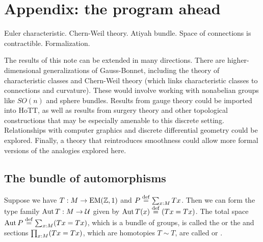 \section{Appendix: the program ahead}

Euler characteristic. Chern-Weil theory. Atiyah bundle. Space of connections is contractible. Formalization.

The results of this note can be extended in many directions. There are higher-dimensional generalizations of Gauss-Bonnet, including the theory of characteristic classes and Chern-Weil theory (which links characteristic classes to connections and curvature). These would involve working with nonabelian groups like \( SO(n) \) and sphere bundles. Results from gauge theory could be imported into HoTT, as well as results from surgery theory and other topological constructions that may be especially amenable to this discrete setting. Relationships with computer graphics and discrete differential geometry\cite{crane_ddg}\cite{crane_connections} could be explored. Finally, a theory that reintroduces smoothness could allow more formal versions of the analogies explored here. 

\subsection{The bundle of automorphisms}
\label{sec:automorphisms}
\begin{mydef}
Suppose we have \( T:M\to\mathrm{EM}(\mathbb{Z},1) \) and \( P\stackrel{\mathrm{def}}{=}\sum_{x:M}Tx \). Then we can form the type family \( \operatorname{Aut} T:M\to\mathcal{U} \) given by \( \operatorname{Aut} T(x)\stackrel{\mathrm{def}}{=}(Tx=Tx) \). The total space \( \operatorname{Aut} P\stackrel{\mathrm{def}}{=}\sum_{x:M}(Tx=Tx) \), which is a bundle of groups, is called the  or the  and sections \( \prod_{x:M}(Tx=Tx) \), which are homotopies \( T\sim T \), are called  or .
\end{mydef}
